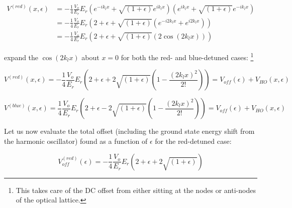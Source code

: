 \begin{equation}
\begin{aligned}
V^{(red)}(x,\epsilon) &= - \frac{1}{4} \frac{V_o}{E_r} E_r  \left ( e^{-i k_l x} + \sqrt{(1+\epsilon)} e^{i k_l x} \right ) \left ( e^{i k_l x} + \sqrt{(1+\epsilon)} e^{-i k_l x} \right ) \\
& =  - \frac{1}{4} \frac{V_o}{E_r} E_r \left ( 2+\epsilon + \sqrt{(1+\epsilon)} \left ( e^{- i 2 k_l x}+e^{i 2 k_l x} \right ) \right ) \\
& = -\frac{1}{4} \frac{V_o}{E_r} E_r \left ( 2+ \epsilon + \sqrt{(1+\epsilon)} \left ( 2 \cos(2 k_l x)  \right ) \right )
\end{aligned}
\end{equation}
%
%
%

expand the $\cos(2 k_l x)$ about $x=0$ for both the red- and blue-detuned cases: \footnote{This takes care of the DC offset from either sitting at the nodes or anti-nodes of the optical lattice.}

\begin{equation}
V^{(red)}(x,\epsilon) = -\frac{1}{4} \frac{V_o}{E_r} E_r \left ( 2+ \epsilon + 2 \sqrt{(1+\epsilon)} \left ( 1 - \frac{(2 k_l x)^2}{2!} \right )  \right ) = V_{off} (\epsilon) + V_{HO}(x,\epsilon)
\end{equation}

\begin{equation}
V^{(blue)}(x,\epsilon) = \frac{1}{4} \frac{V_o}{E_r} E_r \left ( 2+ \epsilon - 2 \sqrt{(1+\epsilon)} \left ( 1 - \frac{(2 k_l x)^2}{2!} \right )  \right ) = V_{off} (\epsilon) + V_{HO}(x,\epsilon)
\end{equation}

Let us now evaluate the total offset (including the ground state energy shift from the harmonic oscillator) found as a function of $\epsilon$ for the red-detuned case:

\[
V_{off} ^{(red)}(\epsilon) = - \frac{1}{4} \frac{V_o}{E_r} E_r \left ( 2 + \epsilon + 2 \sqrt{(1+\epsilon)} \right )
\]


